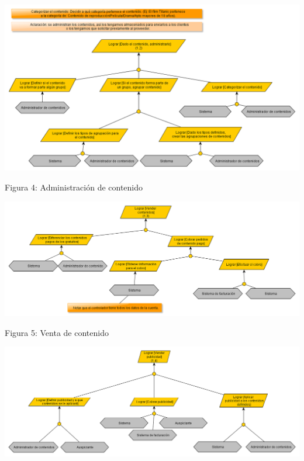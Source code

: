 \documentclass[11pt, a4paper, spanish]{article}
\begin{document}
\newpage
	\begin{center}
		\includegraphics[scale=0.64, angle=90]{Diagramas/1-2ModelodeObjetivosAdministrarcontenido.png}
	\end{center}
	\begin{center}
		\small{Figura 4: Administraci\'on de contenido}
	\end{center}
\newpage
	\begin{center}
		\includegraphics[scale=0.60, angle=90]{Diagramas/1-3ModelodeObjetivosVendercontenido.png}
	\end{center}
	\begin{center}
		\small{Figura 5: Venta de contenido}
	\end{center}
\newpage
	\begin{center}
		\includegraphics[scale=0.59, angle=90]{Diagramas/1-4ModelodeObjetivosVenderpublicidad.png}
	\end{center}
\end{document}
